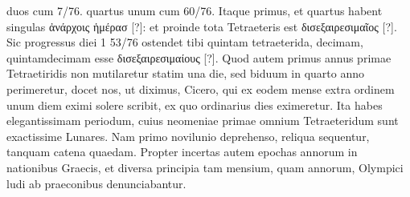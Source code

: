 duos cum 7/76. quartus unum cum 60/76.
Itaque primus, et quartus
habent singulas \textgreek{ἀνάρχοις ἡμέρασ [?]}:
 et proinde tota Tetraeteris est \textgreek{δισεξαιρεσιμαῖος [?]}.
Sic progressus diei 1 53/76 ostendet tibi quintam tetraeterida,
decimam, quintamdecimam esse \textgreek{δισεξαιρεσιμαίους [?]}.
Quod autem
primus annus primae Tetraetiridis non mutilaretur statim una die, sed
biduum in quarto anno perimeretur, docet nos, ut diximus, Cicero,
qui ex eodem mense extra ordinem unum diem eximi solere scribit, ex
quo ordinarius dies eximeretur.
Ita habes elegantissimam periodum,
cuius neomeniae primae omnium Tetraeteridum sunt exactissime Lunares.
Nam primo novilunio deprehenso, reliqua sequentur, tanquam
catena quaedam.
Propter incertas autem epochas annorum in nationibus
Graecis, et diversa principia tam mensium, quam annorum, Olympici
ludi ab praeconibus denunciabantur.

